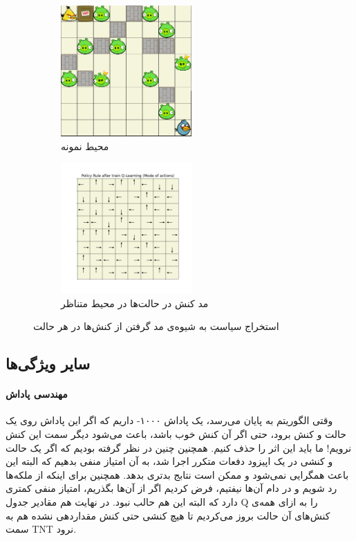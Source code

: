 \documentclass[11pt, a4paper, oneside]{report}
\begin{document}
	\begin{center}
\begin{figure}[H]
	\begin{subfigure}{5cm}
		\includegraphics[width=5cm]{./images/env1.png}
		\caption{محیط نمونه}
		\label{fig:e}
	\end{subfigure}
	\hfill
	\begin{subfigure}{5cm}
		\includegraphics[width=5cm]{./images/policy.png}
		\caption{مد کنش‌ در حالت‌ها در محیط متناظر}
		\label{fig:f}
	\end{subfigure}
	
	\caption{ استخراج سیاست به شیوه‌ی مد گرفتن از کنش‌ها در هر حالت }
	\label{Policy}
	
\end{figure}
	\end{center}
	
	\subsection{سایر ویژگی‌ها}
	\paragraph{مهندسی پاداش}
	وقتی الگوریتم به پایان می‌رسد، یک پاداش ۱۰۰۰- داریم که اگر این پاداش روی یک حالت و کنش برود، حتی اگر آن کنش خوب باشد، باعث می‌شود دیگر سمت این کنش نرویم! ما باید این اثر را حذف کنیم.
	همچنین چنین در نظر گرفته بودیم که اگر یک حالت و کنشی در یک اپیزود دفعات متکرر اجرا شد، به آن امتیاز منفی بدهیم که البته این باعث همگرایی نمی‌شود و ممکن است نتابج بدتری بدهد. همچنین برای اینکه از ملکه‌ها رد شویم و در دام آن‌ها نیفتیم، فرض کردیم اگر از آن‌ها بگذریم، امتیاز منفی کمتری دارد که البته این هم حالب نبود. در نهایت هم مقادیر جدول Q را به ازای همه‌ی کنش‌های آن حالت بروز می‌کردیم تا هیچ کنشی حتی کنش مقداردهی نشده هم به سمت TNT نرود.
	
\end{document}
